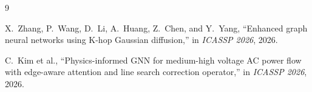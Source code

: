 \documentclass{article}
\begin{document}
\begin{thebibliography}{9}

X.~Zhang, P.~Wang, D.~Li, A.~Huang, Z.~Chen, and Y.~Yang,
``Enhanced graph neural networks using K-hop Gaussian diffusion,''
in \emph{ICASSP 2026}, 2026.

C.~Kim et al.,
``Physics-informed GNN for medium-high voltage AC power flow with
edge-aware attention and line search correction operator,''
in \emph{ICASSP 2026}, 2026.

\end{thebibliography}
\end{document}
